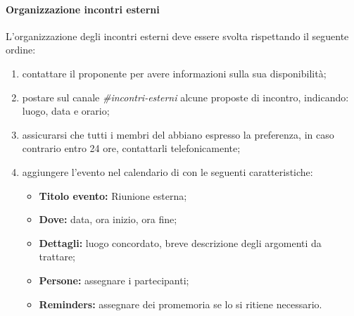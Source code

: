 	        \paragraph{Organizzazione incontri esterni}
	        \label{sec:incontri_esterni}
	        L'organizzazione degli incontri esterni deve essere svolta rispettando il seguente ordine:
	         \begin{enumerate}
		        \item contattare il proponente per avere informazioni sulla sua disponibilità;
		        \item postare sul canale  \textit{\#incontri-esterni}{} alcune proposte di incontro, indicando: luogo, data e orario;
		        \item assicurarsi che tutti i membri del  abbiano espresso la preferenza, in caso contrario entro 24 ore, contattarli telefonicamente;
		        \item aggiungere l'evento nel calendario di  con le seguenti caratteristiche:
		        \begin{itemize}
		        	\item \textbf{Titolo evento:} Riunione esterna;
		        	\item \textbf{Dove:} data, ora inizio, ora fine;
		        	\item \textbf{Dettagli:} luogo concordato, breve descrizione degli argomenti da trattare;
		        	\item \textbf{Persone:} assegnare i partecipanti;
		        	\item \textbf{Reminders:} assegnare dei promemoria se lo si ritiene necessario.
		        \end{itemize}
	        \end{enumerate}
